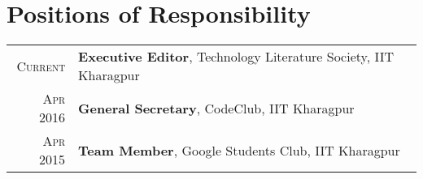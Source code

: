 \documentclass[a4paper,10pt]{extarticle} %
\begin{document}

\section{Positions of Responsibility}

\begin{tabular}{r|p{15cm}}
\textsc{Current} & \textbf{Executive Editor}, Technology Literature Society, IIT Kharagpur \\
\textsc{Apr 2016} & \textbf{General Secretary}, CodeClub, IIT Kharagpur \\
\textsc{Apr 2015} & \textbf{Team Member}, Google Students Club, IIT Kharagpur \\
\end{tabular}

\end{document}
